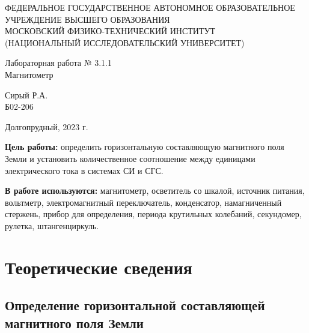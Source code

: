 \documentclass[a4paper,12pt]{article} %
\begin{document}
\begin{center}
  \footnotesize{ФЕДЕРАЛЬНОЕ ГОСУДАРСТВЕННОЕ АВТОНОМНОЕ ОБРАЗОВАТЕЛЬНОЕ 			УЧРЕЖДЕНИЕ ВЫСШЕГО ОБРАЗОВАНИЯ}\\
  \footnotesize{МОСКОВСКИЙ ФИЗИКО-ТЕХНИЧЕСКИЙ ИНСТИТУТ\\(НАЦИОНАЛЬНЫЙ 			ИССЛЕДОВАТЕЛЬСКИЙ УНИВЕРСИТЕТ)}\\
  \hfill \break
  \hfill \break
  \hfill \break
  \hfill \break
\end{center}

\hfill \break
\hfill \break
\hfill \break
\hfill \break
\hfill \break
\hfill \break
\hfill \break
\hfill \break


\begin{center}   
  \hfill \break
  \hfill \break
  \hfill \break
  \large{Лабораторная работа № 3.1.1\\ \hfill \break\Large{Магнитометр}}\\
  \hfill \break
  \hfill \break
  \hfill \break
  \hfill \break
  \begin{flushright}
    Сирый Р.А.\\
    Б02-206
  \end{flushright}
  \hfill \break
  \hfill \break
  \hfill \break
\end{center}
\hfill \break
\hfill \break
\hfill \break
\hfill \break
\begin{center}
  Долгопрудный, 2023 г.
\end{center}
\thispagestyle{empty}

\newpage

\textbf{Цель работы:} определить горизонтальную составляющую магнитного
поля Земли и установить количественное соотношение между единицами
электрического тока в системах СИ и СГС.

\textbf{В работе используются:} магнитометр, осветитель со шкалой, источник питания, вольтметр, электромагнитный переключатель, конденсатор, намагниченный стержень, прибор для определения, периода крутильных колебаний, секундомер, рулетка, штангенциркуль.

\section{Теоретические сведения}

\subsection{Определение горизонтальной составляющей магнитного поля Земли}
\end{document}
